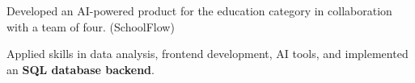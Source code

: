 \documentclass[letterpaper,10pt]{article}
\begin{document}
  \begin{resume_list}
    \item Developed an AI-powered product for the education category in collaboration with a team of four. (SchoolFlow)
    \vspace{1pt}
    \item Applied skills in data analysis, frontend development, AI tools, and implemented an \textbf{SQL database backend}.
    \vspace{-2pt}
  \end{resume_list}
\end{document}
